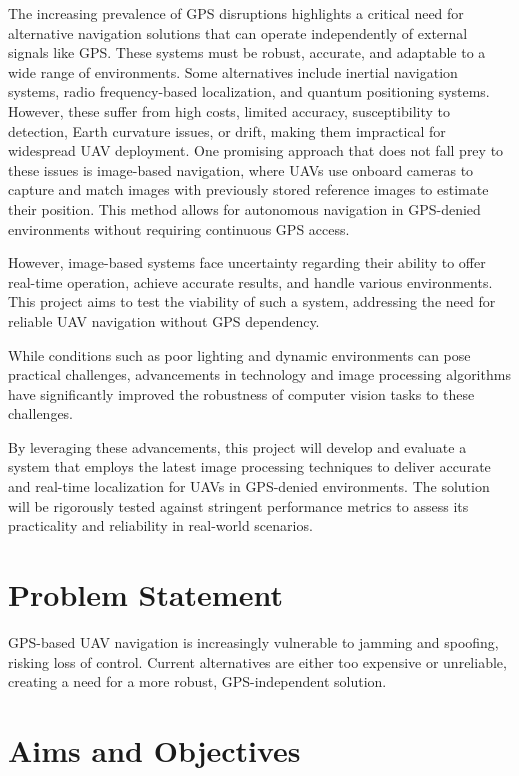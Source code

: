 The increasing prevalence of GPS disruptions highlights a critical need for alternative navigation solutions that can operate independently of external signals like GPS. These systems must be robust, accurate, and adaptable to a wide range of environments. Some alternatives include inertial navigation systems, radio frequency-based localization, and quantum positioning systems. However, these suffer from high costs, limited accuracy, susceptibility to detection, Earth curvature issues, or drift, making them impractical for widespread UAV deployment. One promising approach that does not fall prey to these issues is image-based navigation, where UAVs use onboard cameras to capture and match images with previously stored reference images to estimate their position. This method allows for autonomous navigation in GPS-denied environments without requiring continuous GPS access.

However, image-based systems face uncertainty regarding their ability to offer real-time operation, achieve accurate results, and handle various environments. This project aims to test the viability of such a system, addressing the need for reliable UAV navigation without GPS dependency.

While conditions such as poor lighting and dynamic environments can pose practical challenges, advancements in technology and image processing algorithms have significantly improved the robustness of computer vision tasks to these challenges.

By leveraging these advancements, this project will develop and evaluate a system that employs the latest image processing techniques to deliver accurate and real-time localization for UAVs in GPS-denied environments. The solution will be rigorously tested against stringent performance metrics to assess its practicality and reliability in real-world scenarios.





\section{Problem Statement}
GPS-based UAV navigation is increasingly vulnerable to jamming and spoofing, risking loss of control. Current alternatives are either too expensive or unreliable, creating a need for a more robust, GPS-independent solution.

\section{Aims and Objectives}
